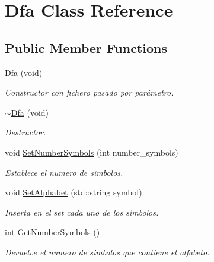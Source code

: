 \hypertarget{classDfa}{}\section{Dfa Class Reference}
\label{classDfa}
\subsection*{Public Member Functions}
\begin{DoxyCompactItemize}
\item 
\hyperlink{classDfa_a89c2bffef86525363c275b3fe60fc57f}{Dfa} (void)
\begin{DoxyCompactList}\small\item\em Constructor con fichero pasado por parámetro. \end{DoxyCompactList}\item 
\mbox{\label{classDfa_ab7a9c61dfb3467e64d8e5d11b1f08e49}} 
\hyperlink{classDfa_ab7a9c61dfb3467e64d8e5d11b1f08e49}{$\sim$\+Dfa} (void)
\begin{DoxyCompactList}\small\item\em Destructor. \end{DoxyCompactList}\item 
\mbox{\label{classDfa_ac022a12536c2a855066fdfd85fba5ed9}} 
void \hyperlink{classDfa_ac022a12536c2a855066fdfd85fba5ed9}{Set\+Number\+Symbols} (int number\+\_\+symbols)
\begin{DoxyCompactList}\small\item\em Establece el numero de simbolos. \end{DoxyCompactList}\item 
\mbox{\label{classDfa_a094525697d759c4b5b36bf562d920916}} 
void \hyperlink{classDfa_a094525697d759c4b5b36bf562d920916}{Set\+Alphabet} (std\+::string symbol)
\begin{DoxyCompactList}\small\item\em Inserta en el set cada uno de los simbolos. \end{DoxyCompactList}\item 
\mbox{\label{classDfa_a21239eac92e02d748bdc5cee0c52b831}} 
int \hyperlink{classDfa_a21239eac92e02d748bdc5cee0c52b831}{Get\+Number\+Symbols} ()
\begin{DoxyCompactList}\small\item\em Devuelve el numero de simbolos que contiene el alfabeto. \end{DoxyCompactList}\item 

\end{DoxyCompactItemize}
